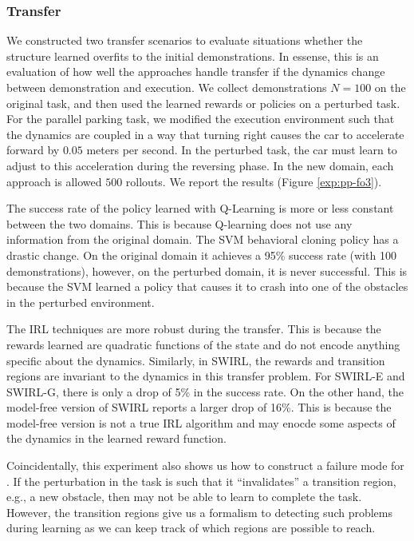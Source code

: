 \subsubsection{Transfer}
We constructed two transfer scenarios to evaluate situations whether the structure learned overfits to the initial demonstrations. In essense, this is an evaluation of how well the approaches handle transfer if the dynamics change between demonstration and execution.
We collect demonstrations $N=100$ on the original task, and then used the learned rewards or policies on a perturbed task.
For the parallel parking task, we modified the execution environment such that the dynamics are coupled in a way that turning right causes the car to accelerate forward by $0.05$ meters per second.
In the perturbed task, the car must learn to adjust to this acceleration during the reversing phase.
In the new domain, each approach is allowed $500$ rollouts. 
We report the results (Figure \ref{exp:pp-fo3}).

The success rate of the policy learned with Q-Learning is more or less constant between the two domains.
This is because Q-learning does not use any information from the original domain.
The SVM behavioral cloning policy has a drastic change.
On the original domain it achieves a 95\% success rate (with 100 demonstrations), however, on the perturbed domain, it is never successful.
This is because the SVM learned a policy that causes it to crash into one of the obstacles in the perturbed environment.

The IRL techniques are more robust during the transfer.
This is because the rewards learned are quadratic functions of the state and do not encode anything specific about the dynamics.
Similarly, in SWIRL, the rewards and transition regions are invariant to the dynamics in this transfer problem.
For SWIRL-E and SWIRL-G, there is only a drop of 5\% in the success rate.
On the other hand, the model-free version of SWIRL reports a larger drop of 16\%.
This is because the model-free version is not a true IRL algorithm and may enocde some aspects of the dynamics in the learned reward function.

Coincidentally, this experiment also shows us how to construct a failure mode for \hirl.
If the perturbation in the task is such that it ``invalidates'' a transition region, e.g., a new obstacle, then \hirl may not be able to learn to complete the task.
However, the transition regions give us a formalism to detecting such problems during learning as we can keep track of which regions are possible to reach.


